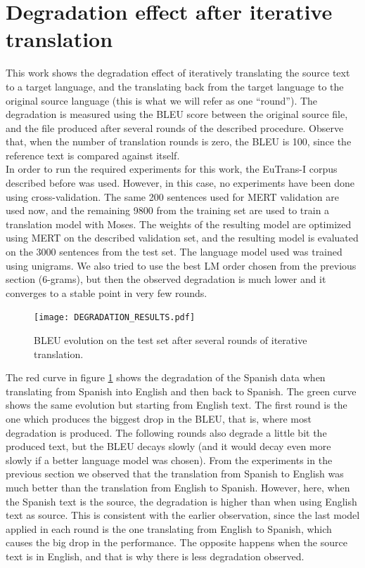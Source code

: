\documentclass[10pt,a4paper]{article}
\begin{document}
\section{Degradation effect after iterative translation}
This work shows the degradation effect of iteratively translating the source text to a target language, and the translating back from the target language to the original source language (this is what we will refer as one ``round''). The degradation is measured using the BLEU score between the original source file, and the file produced after several rounds of the described procedure. Observe that, when the number of translation rounds is zero, the BLEU is 100, since the reference text is compared against itself.\\

In order to run the required experiments for this work, the EuTrans-I corpus described before was used. However, in this case, no experiments have been done using cross-validation. The same 200 sentences used for MERT validation are used now, and the remaining 9800 from the training set are used to train a translation model with Moses. The weights of the resulting model are optimized using MERT on the described validation set, and the resulting model is evaluated on the 3000 sentences from the test set. The language model used was trained using unigrams. We also tried to use the best LM order chosen from the previous section ($6$-grams), but then the observed degradation is much lower and it converges to a stable point in very few rounds.\\

\begin{figure}[h]
\centering
\texttt{[image: DEGRADATION\_RESULTS.pdf]}
\caption{BLEU evolution on the test set after several rounds of iterative translation.}
\label{fig:degradation}
\end{figure}

The red curve in figure \ref{fig:degradation} shows the degradation of the Spanish data when translating from Spanish into English and then back to Spanish. The green curve shows the same evolution but starting from English text. The first round is the one which produces the biggest drop in the BLEU, that is, where most degradation is produced. The following rounds also degrade a little bit the produced text, but the BLEU decays slowly (and it would decay even more slowly if a better language model was chosen). From the experiments in the previous section we observed that the translation from Spanish to English was much better than the translation from English to Spanish. However, here, when the Spanish text is the source, the degradation is higher than when using English text as source. This is consistent with the earlier observation, since the last model applied in each round is the one translating from English to Spanish, which causes the big drop in the performance. The opposite happens when the source text is in English, and that is why there is less degradation observed.
\end{document}
